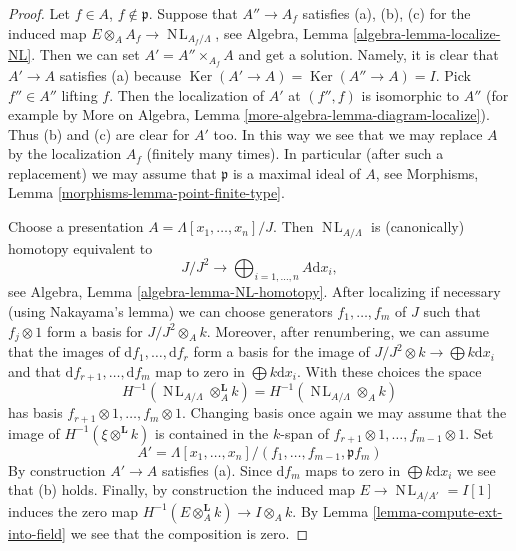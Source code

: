 \documentclass[10pt,a4paper]{amsart}
\theoremstyle{plain}
\theoremstyle{definition}
\theoremstyle{remark}
\numberwithin{equation}{subsection}
\def\NL{\mathop{N\!L}\nolimits}
\def\Ker{\mathop{\mathrm{Ker}}}
\begin{document}
\begin{proof}
Let $f \in A$, $f \not \in \mathfrak p$. Suppose that $A'' \to A_f$
satisfies (a), (b), (c) for the induced map
$E \otimes_A A_f \to \NL_{A_f/\Lambda}$, see
Algebra, Lemma \ref{algebra-lemma-localize-NL}.
Then we can set $A' = A'' \times_{A_f} A$ and get a solution.
Namely, it is clear that $A' \to A$ satisfies (a) because
$\Ker(A' \to A) = \Ker(A'' \to A) = I$. Pick
$f'' \in A''$ lifting $f$. Then the localization of $A'$ at
$(f'', f)$ is isomorphic to $A''$
(for example by
More on Algebra, Lemma \ref{more-algebra-lemma-diagram-localize}).
Thus (b) and (c) are clear for $A'$ too.
In this way we see that we may replace $A$ by the localization
$A_f$ (finitely many times).
In particular (after such a replacement) we may assume that $\mathfrak p$
is a maximal ideal of $A$, see
Morphisms, Lemma \ref{morphisms-lemma-point-finite-type}.

\medskip\noindent
Choose a presentation $A = \Lambda[x_1, \ldots, x_n]/J$. Then
$\NL_{A/\Lambda}$ is (canonically) homotopy equivalent to
$$
J/J^2
\longrightarrow
\bigoplus\nolimits_{i = 1, \ldots, n} A\text{d}x_i,
$$
see Algebra, Lemma \ref{algebra-lemma-NL-homotopy}. After localizing
if necessary (using Nakayama's lemma) we can choose generators
$f_1, \ldots, f_m$ of $J$ such that $f_j \otimes 1$ form a basis for
$J/J^2 \otimes_A k$. Moreover, after renumbering, we can assume that the
images of $\text{d}f_1, \ldots, \text{d}f_r$ form a
basis for the image of $J/J^2 \otimes k \to \bigoplus k\text{d}x_i$
and that $\text{d}f_{r + 1}, \ldots, \text{d}f_m$ map to zero in
$\bigoplus k\text{d}x_i$. With these choices the space
$$
H^{-1}(\NL_{A/\Lambda} \otimes^{\mathbf{L}}_A k) =
H^{-1}(\NL_{A/\Lambda} \otimes_A k)
$$
has basis $f_{r + 1} \otimes 1, \ldots, f_m \otimes 1$. Changing basis
once again we may assume that the image of $H^{-1}(\xi \otimes^{\mathbf{L}} k)$
is contained in the $k$-span of
$f_{r + 1} \otimes 1, \ldots, f_{m - 1} \otimes 1$.
Set
$$
A' = \Lambda[x_1, \ldots, x_n]/(f_1, \ldots, f_{m - 1}, \mathfrak pf_m)
$$
By construction $A' \to A$ satisfies (a). Since $\text{d}f_m$ maps
to zero in $\bigoplus k\text{d}x_i$ we see that (b) holds. Finally, by
construction the induced map $E \to \NL_{A/A'} = I[1]$ induces the zero map
$H^{-1}(E \otimes_A^\mathbf{L} k) \to I \otimes_A k$. By
Lemma \ref{lemma-compute-ext-into-field}
we see that the composition is zero.
\end{proof}
\end{document}
